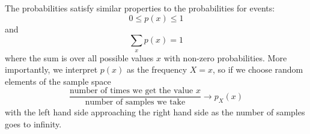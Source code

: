 \documentclass[11pt,a4paper]{scrartcl}
\begin{document}
The probabilities satisfy similar properties to the probabilities for
events:
\begin{equation}
0\le p(x)\le 1
\end{equation}
and 
\begin{equation}
\sum_x{p(x)}=1
\end{equation}
where the sum is over all possible values $x$ with non-zero
probabilities. More importantly, we interpret $p(x)$ as the frequency
$X=x$, so if we choose random elements of the sample space 
\begin{equation}
\frac{\mbox{number of times we get the value }x}{\mbox{number of samples we take}}\rightarrow p_X(x)
\end{equation}
with the left hand side approaching the right hand side as the number
of samples goes to infinity.
\end{document}
